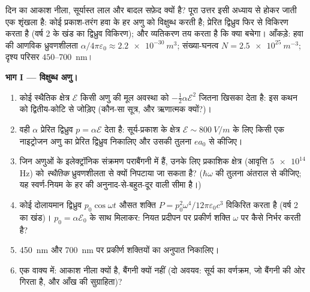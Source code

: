 \begin{problem}\label{pb:b3:perturbation-theory:1}
दिन का आकाश नीला, सूर्यास्त लाल और बादल सफ़ेद क्यों है? पूरा
उत्तर इसी अध्याय से होकर जाती एक शृंखला है: कोई प्रकाश-तरंग हवा के हर
अणु को विक्षुब्ध करती है; प्रेरित द्विध्रुव फिर से विकिरण करता है (वर्ष
2 के खंड का द्विध्रुव विकिरण); और व्यतिकरण तय करता है
कि क्या बचेगा। आँकड़े: हवा की आणविक ध्रुवणशीलता
$\alpha/4\pi\varepsilon_0 \approx \qty{2.2e-30}{m^3}$; संख्या-घनत्व
$N = \qty{2.5e25}{m^{-3}}$; दृश्य परिसर
$450$--\qty{700}{nm}।

\medskip\noindent\textbf{भाग I --- विक्षुब्ध अणु।}
\begin{enumerate}
  \item कोई स्थैतिक क्षेत्र $\mathcal E$ किसी अणु की मूल अवस्था को
        $-\tfrac12\alpha\mathcal E^2$ जितना खिसका देता है: इस
        कथन को द्वितीय-कोटि  से जोड़िए (कौन-सा
        सूत्र, और ऋणात्मक क्यों?)।
  \item वही $\alpha$ प्रेरित द्विध्रुव $p =
        \alpha\mathcal E$ देता है: सूर्य-प्रकाश के क्षेत्र $\mathcal E \sim
        \qty{800}{V/m}$ के लिए किसी एक नाइट्रोजन अणु का प्रेरित
        द्विध्रुव निकालिए और उसकी तुलना $ea_0$ से कीजिए।
  \item जिन अणुओं के इलेक्ट्रॉनिक संक्रमण पराबैंगनी में हैं, उनके
        लिए प्रकाशिक क्षेत्र (आवृत्ति $\num{5e14}$ Hz) को
        \emph{स्थैतिक} ध्रुवणशीलता से क्यों निपटाया जा सकता है?
        ($\hbar\omega$ की तुलना अंतराल से कीजिए; यह स्वर्ण-नियम के
        हर की अनुनाद-से-बहुत-दूर वाली सीमा है।)
  \item कोई दोलायमान द्विध्रुव $p_0\cos\omega t$ औसत शक्ति
        $P = p_0^2\omega^4/12\pi\varepsilon_0c^3$ विकिरित करता है
        (वर्ष 2 का खंड)। $p_0 = \alpha\mathcal
        E_0$ के साथ मिलाकर: नियत प्रदीपन पर प्रकीर्ण शक्ति
        $\omega$ पर कैसे निर्भर करती है?
  \item \qty{450}{nm} और \qty{700}{nm} पर प्रकीर्ण शक्तियों का
        अनुपात निकालिए।
  \item एक वाक्य में: आकाश नीला क्यों है, बैंगनी क्यों नहीं
        (दो अवयव: सूर्य का वर्णक्रम, जो बैंगनी की ओर गिरता है, और
        आँख की सुग्राहिता)?
\end{enumerate}


\end{problem}
